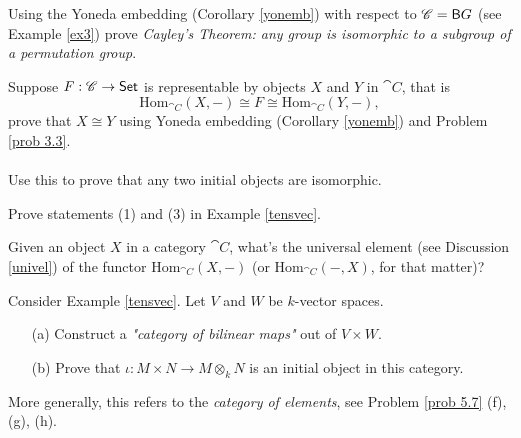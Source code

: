 \vspace{0.1in}

\begin{problem}\label{prob 5.3}
Using the Yoneda embedding (Corollary \ref{yonemb}) with respect to $\mathscr{C} = \mathsf{B}G$ (see Example \ref{ex3}) prove \emph{Cayley's Theorem: any group is isomorphic to a subgroup of a permutation group}.
\end{problem}

\vspace{0.1in}

\begin{problem}\label{prob 5.4}
Suppose $F:\mathscr{C} \to \mathsf{Set}$ is representable by objects $X$ and $Y$ in $\cat{C}$, that is
\[\mathrm{Hom}_{\cat{C}}(X,-) \cong F \cong \mathrm{Hom}_{\cat{C}}(Y,-),\]
prove that $X \cong Y$ using Yoneda embedding (Corollary \ref{yonemb}) and Problem \ref{prob 3.3}.\\
\\
Use this to prove that any two initial objects are isomorphic.
\end{problem}

\vspace{0.1in}

\begin{problem}\label{prob 5.5}
Prove statements (1) and (3) in Example \ref{tensvec}.
\end{problem}

\vspace{0.1in}

\begin{problem}\label{prob 5.5a}
Given an object $X$ in a category $\cat{C}$, what's the universal element (see Discussion \ref{univel}) of the functor $\mathrm{Hom}_{\cat{C}}(X,-)$ (or $\mathrm{Hom}_{\cat{C}}(-,X)$, for that matter)?
\end{problem}

\vspace{0.1in}

\begin{problem}\label{prob 5.6}
Consider Example \ref{tensvec}. Let $V$ and $W$ be $k$-vector spaces.
\begin{itemize}
\item[(a)] Construct a \emph{"category of bilinear maps"} out of $V \times W$.
\item[(b)] Prove that $\iota:M \times N \to M \otimes_k N$ is an initial object in this category.
\end{itemize}
More generally, this refers to the \emph{category of elements}, see Problem \ref{prob 5.7} (f), (g), (h).
\end{problem}

